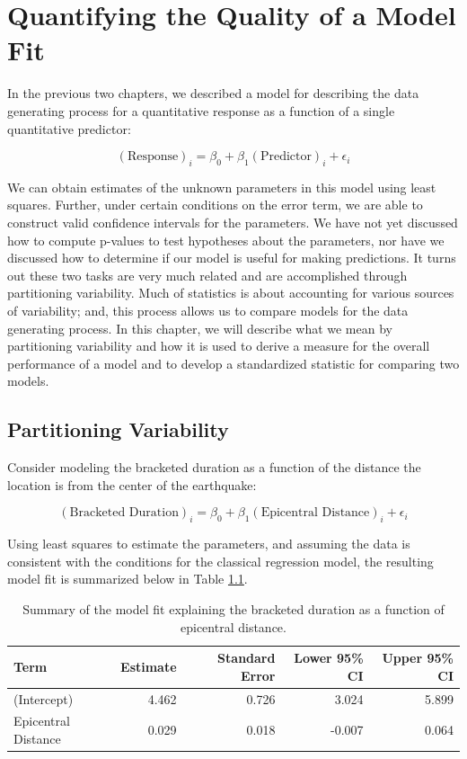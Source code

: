 \documentclass[
]{book}
\theoremstyle{plain}
\theoremstyle{mydefn}
\theoremstyle{myexmpl}
\theoremstyle{remark}
\begin{document}
\hypertarget{Regquality}{%
\chapter{Quantifying the Quality of a Model Fit}\label{Regquality}}

In the previous two chapters, we described a model for describing the data generating process for a quantitative response as a function of a single quantitative predictor:

\[(\text{Response})_i = \beta_0 + \beta_1 (\text{Predictor})_i + \epsilon_i\]

We can obtain estimates of the unknown parameters in this model using least squares. Further, under certain conditions on the error term, we are able to construct valid confidence intervals for the parameters. We have not yet discussed how to compute p-values to test hypotheses about the parameters, nor have we discussed how to determine if our model is useful for making predictions. It turns out these two tasks are very much related and are accomplished through partitioning variability. Much of statistics is about accounting for various sources of variability; and, this process allows us to compare models for the data generating process. In this chapter, we will describe what we mean by partitioning variability and how it is used to derive a measure for the overall performance of a model and to develop a standardized statistic for comparing two models.

\hypertarget{partitioning-variability}{%
\section{Partitioning Variability}\label{partitioning-variability}}

Consider modeling the bracketed duration as a function of the distance the location is from the center of the earthquake:

\[(\text{Bracketed Duration})_i = \beta_0 + \beta_1(\text{Epicentral Distance})_i + \epsilon_i\]

Using least squares to estimate the parameters, and assuming the data is consistent with the conditions for the classical regression model, the resulting model fit is summarized below in Table \ref{tab:regquality-fit}.

\begin{table}

\caption{\label{tab:regquality-fit}Summary of the model fit explaining the bracketed duration as a function of epicentral distance.}
\centering
\begin{tabular}[t]{l|r|r|r|r}
\hline
Term & Estimate & Standard Error & Lower 95\% CI & Upper 95\% CI\\
\hline
(Intercept) & 4.462 & 0.726 & 3.024 & 5.899\\
\hline
Epicentral Distance & 0.029 & 0.018 & -0.007 & 0.064\\
\hline
\end{tabular}
\end{table}
\end{document}
